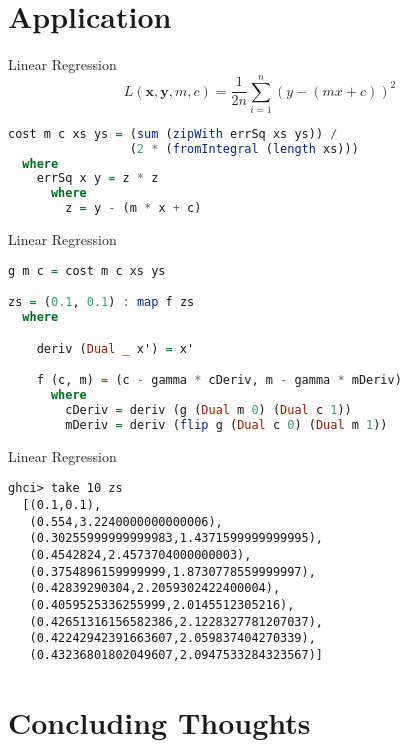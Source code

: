 \documentclass{beamer}
\begin{document}
\section{Application}

\begin{frame}[fragile]{Linear Regression}
$$
L(\boldsymbol{x}, \boldsymbol{y}, m, c) = \frac{1}{2n}\sum_{i=1}^n (y - (mx + c))^2
$$
\begin{scriptsize}
\begin{lstlisting}[language=Haskell]
cost m c xs ys = (sum (zipWith errSq xs ys)) /
                 (2 * (fromIntegral (length xs)))
  where
    errSq x y = z * z
      where
        z = y - (m * x + c)
\end{lstlisting}
\end{scriptsize}
\end{frame}

\begin{frame}[fragile]{Linear Regression}
\begin{scriptsize}
\begin{lstlisting}[language=Haskell]
g m c = cost m c xs ys

zs = (0.1, 0.1) : map f zs
  where

    deriv (Dual _ x') = x'

    f (c, m) = (c - gamma * cDeriv, m - gamma * mDeriv)
      where
        cDeriv = deriv (g (Dual m 0) (Dual c 1))
        mDeriv = deriv (flip g (Dual c 0) (Dual m 1))
\end{lstlisting}
\end{scriptsize}
\end{frame}

\begin{frame}[fragile]{Linear Regression}
\begin{scriptsize}
\begin{lstlisting}
ghci> take 10 zs
  [(0.1,0.1),
   (0.554,3.2240000000000006),
   (0.30255999999999983,1.4371599999999995),
   (0.4542824,2.4573704000000003),
   (0.3754896159999999,1.8730778559999997),
   (0.42839290304,2.2059302422400004),
   (0.4059525336255999,2.0145512305216),
   (0.42651316156582386,2.1228327781207037),
   (0.42242942391663607,2.059837404270339),
   (0.43236801802049607,2.0947533284323567)]
\end{lstlisting}
\end{scriptsize}
\end{frame}

\section{Concluding Thoughts}
\end{document}
